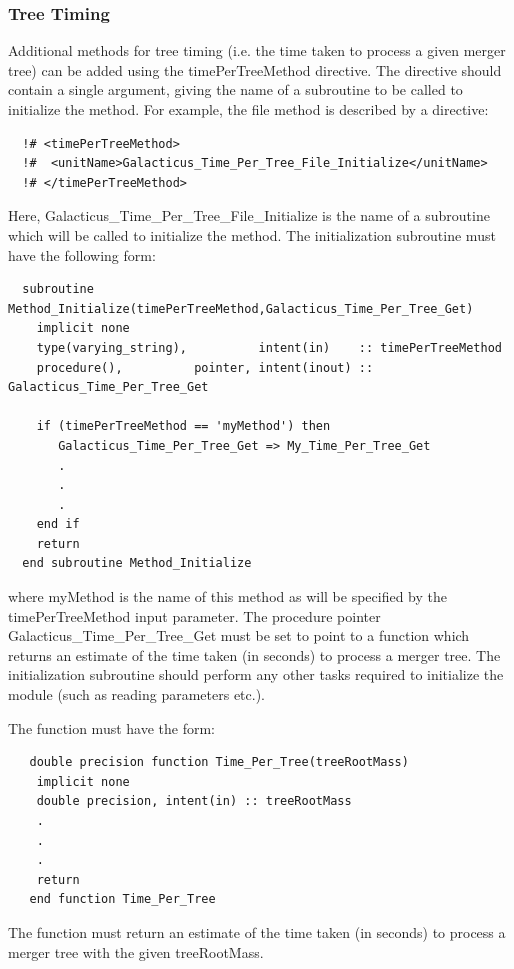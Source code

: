 \subsubsection{Tree Timing}

Additional methods for tree timing (i.e. the time taken to process a given merger tree) can be added using the {\normalfont \ttfamily timePerTreeMethod} directive. The directive should contain a single argument, giving the name of a subroutine to be called to initialize the method. For example, the {\normalfont \ttfamily file} method is described by a directive:
\begin{verbatim}
  !# <timePerTreeMethod>
  !#  <unitName>Galacticus_Time_Per_Tree_File_Initialize</unitName>
  !# </timePerTreeMethod>
\end{verbatim}
Here, {\normalfont \ttfamily Galacticus\_Time\_Per\_Tree\_File\_Initialize} is the name of a subroutine which will be called to initialize the method. The initialization subroutine must have the following form:
\begin{verbatim}
  subroutine Method_Initialize(timePerTreeMethod,Galacticus_Time_Per_Tree_Get)
    implicit none
    type(varying_string),          intent(in)    :: timePerTreeMethod
    procedure(),          pointer, intent(inout) :: Galacticus_Time_Per_Tree_Get
    
    if (timePerTreeMethod == 'myMethod') then
       Galacticus_Time_Per_Tree_Get => My_Time_Per_Tree_Get
       .
       .
       .
    end if
    return
  end subroutine Method_Initialize
\end{verbatim}
where {\normalfont \ttfamily myMethod} is the name of this method as will be specified by the {\normalfont \ttfamily timePerTreeMethod} input parameter. The procedure pointer {\normalfont \ttfamily Galacticus\_Time\_Per\_Tree\_Get} must be set to point to a function which returns an estimate of the time taken (in seconds) to process a merger tree. The initialization subroutine should perform any other tasks required to initialize the module (such as reading parameters etc.).

The function must have the form:
\begin{verbatim}
   double precision function Time_Per_Tree(treeRootMass)
    implicit none
    double precision, intent(in) :: treeRootMass
    .
    .
    .
    return
   end function Time_Per_Tree 
\end{verbatim}
The function must return an estimate of the time taken (in seconds) to process a merger tree with the given {\normalfont \ttfamily treeRootMass}.

